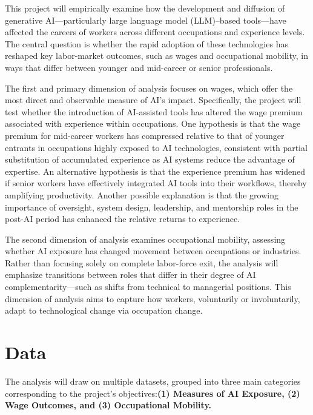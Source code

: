 \documentclass[12pt]{article}
\begin{document}
This project will empirically examine how the development and diffusion of generative AI—particularly large language model (LLM)–based tools—have affected the careers of workers across different occupations and experience levels. The central question is whether the rapid adoption of these technologies has reshaped key labor-market outcomes, such as wages and occupational mobility, in ways that differ between younger and mid-career or senior professionals.

The first and primary dimension of analysis focuses on wages, which offer the most direct and observable measure of AI’s impact. Specifically, the project will test whether the introduction of AI-assisted tools has altered the wage premium associated with experience within occupations. One hypothesis is that the wage premium for mid-career workers has compressed relative to that of younger entrants in occupations highly exposed to AI technologies, consistent with partial substitution of accumulated experience as AI systems reduce the advantage of expertise. An alternative hypothesis is that the experience premium has widened if senior workers have effectively integrated AI tools into their workflows, thereby amplifying productivity. Another possible explanation is that the growing importance of oversight, system design, leadership, and mentorship roles in the post-AI period has enhanced the relative returns to experience.


The second dimension of analysis examines occupational mobility, assessing whether AI exposure has changed movement between occupations or industries. Rather than focusing solely on complete labor-force exit, the analysis will emphasize transitions between roles that differ in their degree of AI complementarity—such as shifts from technical to managerial positions. This dimension of analysis aims to capture how workers, voluntarily or involuntarily, adapt to technological change via occupation change.
\fi

\section{Data}

The analysis will draw on multiple datasets, grouped into three main categories corresponding to the project’s objectives:\textbf{(1) Measures of AI Exposure, (2) Wage Outcomes, and (3) Occupational Mobility.}
\end{document}
